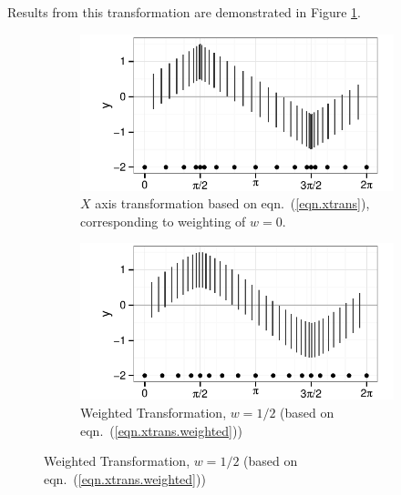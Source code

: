 \documentclass[11pt]{isuthesis}\usepackage[]{graphicx}\usepackage[]{color}
\begin{document}
Results from this transformation are demonstrated in Figure \ref{fig:xtrans1}.
 


\begin{figure}[h!tbp]\centering
\begin{subfigure}[b]{.45\textwidth}\centering 
\includegraphics[keepaspectratio=TRUE,width=\textwidth]{fig-xtransform1}
\caption[$X$ axis transformation]{$X$ axis transformation based on eqn.~(\ref{eqn.xtrans}), corresponding to weighting of $w=0$.}
\label{fig:xtrans1}
\end{subfigure} \hfill\hfill
\begin{subfigure}[b]{.45\textwidth}\centering
\includegraphics[keepaspectratio=TRUE,width=\textwidth]{fig-xtransform2} 
\caption[Weighted transformation]{Weighted Transformation, $w=1/2$ (based on eqn.~(\ref{eqn.xtrans.weighted}))}
\label{fig:xtrans2}
\end{subfigure}


\end{figure}
\end{document}
